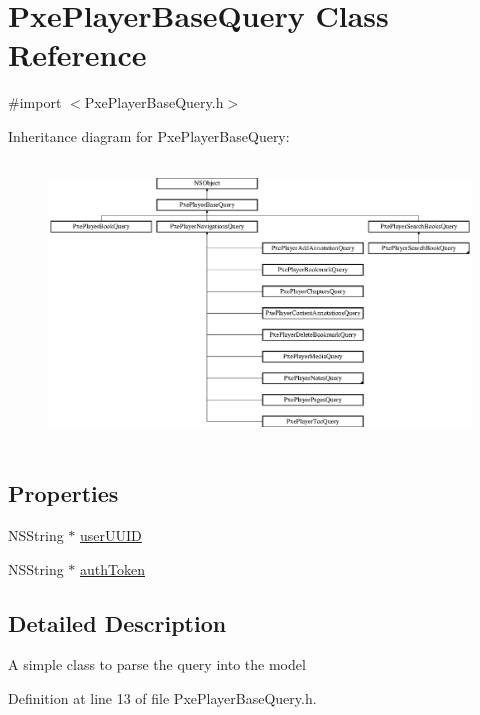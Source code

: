 \hypertarget{interface_pxe_player_base_query}{\section{Pxe\-Player\-Base\-Query Class Reference}
\label{interface_pxe_player_base_query}
}


{\ttfamily \#import $<$Pxe\-Player\-Base\-Query.\-h$>$}

Inheritance diagram for Pxe\-Player\-Base\-Query\-:\begin{figure}[H]
\begin{center}
\leavevmode
\includegraphics[height=7.533633cm]{interface_pxe_player_base_query}
\end{center}
\end{figure}
\subsection*{Properties}
\begin{DoxyCompactItemize}
\item 
N\-S\-String $\ast$ \hyperlink{interface_pxe_player_base_query_a767888800e1aa6448405207e57ab4c9b}{user\-U\-U\-I\-D}
\item 
N\-S\-String $\ast$ \hyperlink{interface_pxe_player_base_query_a49d8f664fabf9e51a73def504d460a63}{auth\-Token}
\end{DoxyCompactItemize}


\subsection{Detailed Description}
A simple class to parse the query into the model 

Definition at line 13 of file Pxe\-Player\-Base\-Query.\-h.



